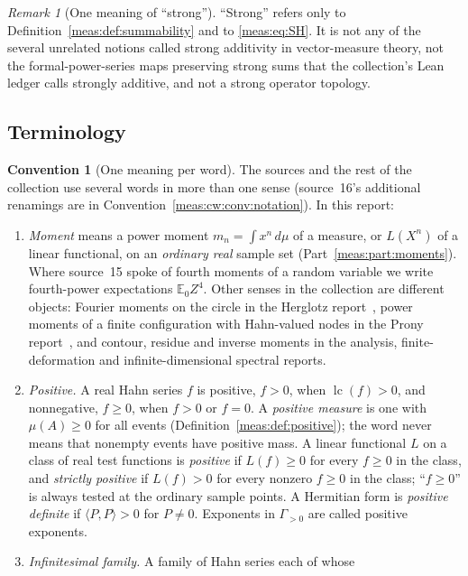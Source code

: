 \documentclass[11pt]{article}
\numberwithin{equation}{section}
\theoremstyle{definition}
\newtheorem{convention}[theorem]{Convention}
\theoremstyle{remark}
\newtheorem{remark}[theorem]{Remark}
\newcommand{\E}{\mathbb E}
\newcommand{\lc}{\operatorname{lc}}
\newcommand{\inner}[2]{\langle#1,#2\rangle}
\begin{document}
\begin{remark}[One meaning of ``strong'']\label{meas:rem:strong-word}
``Strong'' refers only to Definition~\ref{meas:def:summability} and to
\eqref{meas:eq:SH}. It is not any of the several unrelated notions called
strong additivity in vector-measure theory, not the formal-power-series maps
preserving strong sums that the collection's Lean ledger calls strongly
additive, and not a strong operator topology.
\end{remark}

\subsection{Terminology}\label{meas:sub:terms}

\begin{convention}[One meaning per word]\label{meas:conv:terms}
The sources and the rest of the collection use several words in more than one
sense (source~16's additional renamings are in
Convention~\ref{meas:cw:conv:notation}). In this report:
\begin{enumerate}[label=(\alph*)]
\item \emph{Moment} means a power moment $m_n=\int x^n\,d\mu$ of a measure,
or $L(X^n)$ of a linear functional, on an \emph{ordinary real} sample set
(Part~\ref{meas:part:moments}). Where source~15 spoke of fourth moments of a
random variable we write fourth-power expectations $\E_0Z^4$. Other senses in
the collection are different objects: Fourier moments on the circle in the
Herglotz report~\cite{repoherg}, power moments of a finite configuration with
Hahn-valued nodes in the Prony report~\cite{repoprony}, and contour, residue
and inverse moments in the analysis, finite-deformation and
infinite-dimensional spectral reports.
\item \emph{Positive.} A real Hahn series $f$ is positive, $f>0$, when
$\lc(f)>0$, and nonnegative, $f\ge0$, when $f>0$ or $f=0$. A \emph{positive
measure} is one with $\mu(A)\ge0$ for all events
(Definition~\ref{meas:def:positive}); the word never means that nonempty
events have positive mass. A linear functional $L$ on a class of real test
functions is \emph{positive} if $L(f)\ge0$ for every $f\ge0$ in the class, and
\emph{strictly positive} if $L(f)>0$ for every nonzero $f\ge0$ in the class;
``$f\ge0$'' is always tested at the ordinary sample points. A Hermitian form
is \emph{positive definite} if $\inner PP>0$ for $P\ne0$. Exponents in
$\Gamma_{>0}$ are called positive exponents.
\item \emph{Infinitesimal family.} A family of Hahn series each of whose

\end{enumerate}
\end{convention}
\end{document}
